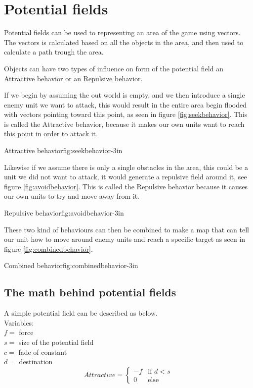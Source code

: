 \section{Potential fields}
	Potential fields can be used to representing an area of the game using vectors.  The vectors is calculated based on all the objects in the area, and then used to calculate a path trough the area.

	Objects can have two types of influence on form of the potential field an Attractive behavior or an Repulsive behavior.
	
	If we begin by assuming the out world is empty, and we then introduce a single enemy unit we want to attack, this would result in the entire area begin flooded with vectors pointing toward this point, as seen in figure \ref{fig:seekbehavior}. This is called the Attractive behavior, because it makes our own units want to reach this point in order to attack it.
	
		{Attractive behavior\cite{pft}}{fig:seekbehavior}{-3in}
	
	Likewise if we assume there is only a single obstacles in the area, this could be a unit we did not want to attack, it would generate a repulsive field around it, see figure \ref{fig:avoidbehavior}. This is called the Repulsive behavior because it causes our own units to try and move away from it.

		{Repulsive behavior\cite{pft}}{fig:avoidbehavior}{-3in}
		
	These two kind of behaviours can then be combined to make a map that can tell our unit how to move around enemy units and reach a specific target as seen in figure \ref{fig:combinedbehavior}.
	
		{Combined behavior\cite{pft}}{fig:combinedbehavior}{-3in}
		
	\subsection{The math behind potential fields}
		A simple potential field can be described as below.\\
		
		Variables:\\
		$f =$ force\\
		$s =$ size of the potential field\\
		$c =$ fade of constant\\
		$d =$ destination\\
		\begin{displaymath}
			Attractive = \begin{cases}
					-f & \text{if $d < s$}\\
					0 & \text{else}
				\end{cases}		
		\end{displaymath}
			
